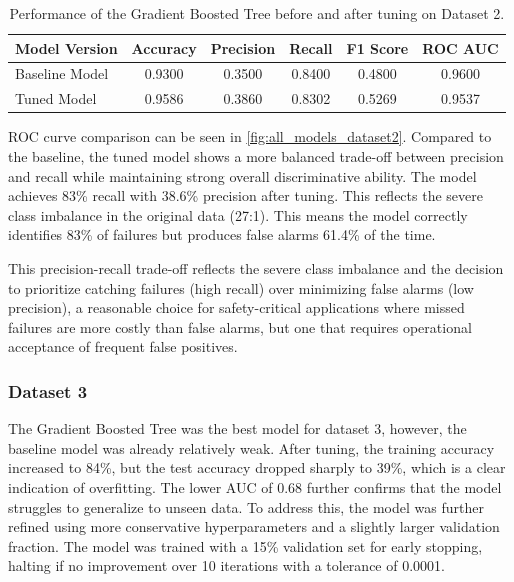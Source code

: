 \documentclass[11pt]{article}
\begin{document}
\begin{table}[h!]
\centering
\begin{tabular}{l c c c c c}
\hline
\textbf{Model Version} & \textbf{Accuracy} & \textbf{Precision} & \textbf{Recall} & \textbf{F1 Score} & \textbf{ROC AUC} \\ 
\hline
Baseline Model & 0.9300 & 0.3500 & 0.8400 & 0.4800 & 0.9600 \\
Tuned Model    & 0.9586 & 0.3860 & 0.8302 & 0.5269 & 0.9537 \\
\hline
\end{tabular}
\caption{Performance of the Gradient Boosted Tree before and after tuning on Dataset 2.}
\label{tab:gbt_tuning_dataset2}
\end{table}

ROC curve comparison can be seen in \ref{fig:all_models_dataset2}. Compared to the baseline, the tuned model shows a more balanced trade-off between precision and recall while maintaining strong overall discriminative ability. The model achieves 83\% recall with 38.6\% precision after tuning. This reflects the severe class imbalance in the original data (27:1). This means the model correctly identifies 83\% of failures but produces false alarms 61.4\% of the time. 

This precision-recall trade-off reflects the severe class imbalance and the decision to prioritize catching failures (high recall) over minimizing false alarms (low precision), a reasonable choice for safety-critical applications where missed failures are more costly than false alarms, but one that requires operational acceptance of frequent false positives.


\subsubsection{Dataset 3}

The Gradient Boosted Tree was the best model for dataset 3, however, the baseline model was already relatively weak. After tuning, the training accuracy increased to 84\%, but the test accuracy dropped sharply to 39\%, which is a clear indication of overfitting. The lower AUC of 0.68 further confirms that the model struggles to generalize to unseen data. To address this, the model was further refined using more conservative hyperparameters and a slightly larger validation fraction. The model was trained with a 15\% validation set for early stopping, halting if no improvement over 10 iterations with a tolerance of 0.0001.
\end{document}

